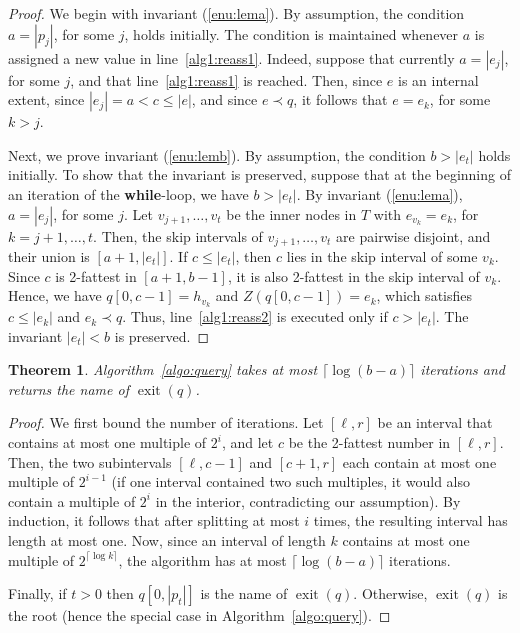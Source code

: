 \documentclass[a4paper,11pt]{article}
\newtheorem{theorem} {Theorem}[section]
\newcommand{\?}{\mskip1.5mu}
\DeclareMathOperator{\exit}{exit}
\begin{document}
\begin{proof}
We begin with invariant (\ref{enu:lema}).
By assumption, the condition $a = |p_j|$, for some $j$, holds
initially. The condition is maintained whenever
$a$ is assigned a new value in line~\ref{alg1:reass1}. 
Indeed, suppose that currently $a = |e_j|$, for some $j$, and
that line~\ref{alg1:reass1} is reached. Then, since $e$ is an 
internal extent, since $|e_j| = a  < c  \leq |e|$, 
and since $e \prec q$, it follows that $e = e_k$, for some $k > j$.

Next, we prove invariant (\ref{enu:lemb}).
By assumption, the condition $b > |e_t|$ holds initially.
To show that the invariant is preserved,
suppose that at the beginning of an iteration of the
\textbf{while}-loop, we have $b > |e_t|$.
By invariant (\ref{enu:lema}), $a = |e_j|$, for some $j$.  
Let $v_{j+1}, \dots, v_{t}$ be the inner nodes in $T$ 
with $e_{v_k} = e_k$, for $k = j + 1, \dots, t$.
Then, the skip intervals of $v_{j+1}, \dots, v_t$ are 
pairwise disjoint, and their union is $[a + 1, |e_t|]$.
If $c \leq |e_t|$, then $c$ lies in the
skip interval of some $v_k$.
Since $c$ is 2-fattest in $[a + 1, b - 1]$, 
it is also 2-fattest in the skip interval of $v_k$. 
Hence, we have $q[0, c - 1] = h_{v_k}$ and 
$Z(q[0, c - 1]) = e_k$, 
which satisfies $c \leq |e_k|$ and $e_k  \prec q$. 
Thus, line~\ref{alg1:reass2} is executed only if $c > |e_t|$.
The invariant $|e_t| < b$ is preserved.
\end{proof}

\begin{theorem}
\label{thm:correctnessfbs}
Algorithm~\ref{algo:query} takes at most $\lceil\log(b-a)\rceil$
iterations
and returns the name of $\exit(q)$.
\end{theorem}

\begin{proof}
We first bound the number of iterations. Let 
$[\ell, r]$ be an interval that contains at most one multiple of 
$2^i$, and let $c$ be the 2-fattest number in $[\ell, r]$. Then, 
the two subintervals $[\ell, c - 1]$ and $[c + 1, r]$ each contain at most 
one multiple of $2^{i-1}$ (if one interval contained two such 
multiples, it would also contain a multiple of $2^i$
in the interior, contradicting our assumption).
By induction, it follows that after splitting
at most $i$ times, the resulting interval has length at most one. 
Now, since an interval of length $k$ contains at most one multiple of 
$2^{\lceil\log k\rceil}$, the algorithm
has at most $\lceil\log(b-a)\rceil$ iterations.

Finally, if $t > 0$ then $q[0, |p_t|]$ is the name of $\exit(q)$.
Otherwise, $\exit(q)$ is the root (hence the special case in 
Algorithm~\ref{algo:query}).
\end{proof}
\end{document}
